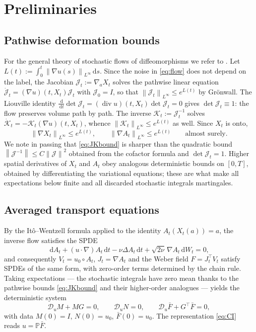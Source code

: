 \documentclass[11pt,reqno]{amsart}
\newcommand{\dd}{\,\mathrm{d}}
\newcommand{\norm}[1]{\left\lVert #1\right\rVert}
\newcommand{\Leray}{\mathbb{P}}
\DeclareMathOperator{\diver}{div}
\theoremstyle{definition}
\begin{document}
\section{Preliminaries}\label{sec:prelim}

\subsection{Pathwise deformation bounds}
For the general theory of stochastic flows of diffeomorphisms we refer to
\cite{Kunita1997}. Let $L(t):=\int_0^t\norm{\nabla u(s)}_{L^\infty}\dd s$. Since the noise in \eqref{eq:flow}
does not depend on the label, the Jacobian $\mathcal J_t:=\nabla_a X_t$ solves the pathwise
linear equation $\dot{\mathcal J}_t=(\nabla u)(t,X_t)\mathcal J_t$ with
$\mathcal J_0=I$, so that $\norm{\mathcal J_t}_{L^\infty}\le e^{L(t)}$ by Gr\"onwall. The
Liouville identity
$\frac{\dd}{\dd t}\det\mathcal J_t=(\diver u)(t,X_t)\det\mathcal J_t=0$ gives
$\det\mathcal J_t\equiv1$: the flow preserves volume path by path. The inverse
$\mathcal K_t:=\mathcal J_t^{-1}$ solves
$\dot{\mathcal K}_t=-\mathcal K_t(\nabla u)(t,X_t)$, whence
$\norm{\mathcal K_t}_{L^\infty}\le e^{L(t)}$ as well. Since $X_t$ is onto,
\begin{equation}\label{eq:JKbound}
  \norm{\nabla X_t}_{L^\infty}\le e^{L(t)},\qquad
  \norm{\nabla A_t}_{L^\infty}\le e^{L(t)}\qquad\text{almost surely.}
\end{equation}
We note in passing that \eqref{eq:JKbound} is sharper than the quadratic bound
$\norm{\mathcal J^{-1}}\le C\norm{\mathcal J}^2$ obtained from the cofactor formula and
$\det\mathcal J_t=1$. Higher spatial derivatives of $X_t$ and $A_t$ obey analogous
deterministic bounds on $[0,T]$, obtained by differentiating the variational equations;
these are what make all expectations below finite and all discarded stochastic integrals
martingales.

\subsection{Averaged transport equations}
By the It\^o--Wentzell formula applied to the identity $A_t(X_t(a))=a$, the inverse flow
satisfies the SPDE
\begin{equation}\label{eq:SPDEA}
  \dd A_t+(u\cdot\nabla)A_t\dd t-\nu\Delta A_t\dd t+\sqrt{2\nu}\,\nabla A_t\dd W_t=0 ,
\end{equation}
and consequently $V_t=u_0\circ A_t$, $J_t=\nabla A_t$ and the Weber field $F=J_t^\top V_t$
satisfy SPDEs of the same form, with zero-order terms determined by the chain rule. Taking
expectations --- the stochastic integrals have zero mean thanks to the pathwise bounds
\eqref{eq:JKbound} and their higher-order analogues --- yields the deterministic system
\begin{equation}\label{eq:MNF}
  \mathcal D_u M+MG=0,\qquad \mathcal D_u N=0,\qquad \mathcal D_u\bar F+G^\top\bar F=0,
\end{equation}
with data $M(0)=I$, $N(0)=u_0$, $\bar F(0)=u_0$. The representation \eqref{eq:CI} reads
$u=\Leray\bar F$.
\end{document}
